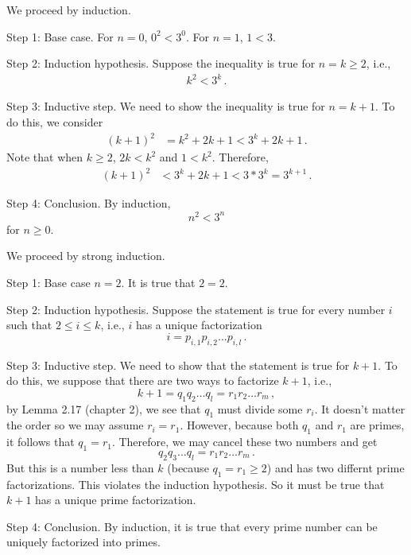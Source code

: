 \documentclass[12pt]{amsart}
\begin{document}
\begin{problem}[4.7]
We proceed by induction.

Step 1: Base case.  For $n= 0$,
$0^2 < 3^0$.
For $n = 1$, $1 < 3$.

Step 2: Induction hypothesis. Suppose the inequality is true for $n = k\geq 2$, i.e.,
\begin{align*}
	k^2 < 3^k \,.
\end{align*}

Step 3: Inductive step. We need to show the inequality is true for $n= k+1$.
To do this, we consider
\begin{align*}
	(k+1)^2 & = k^2 + 2k +1 < 3^k + 2k +1\,.
\end{align*}
Note that when $k\geq 2$, $2k < k^2$ and $1 < k^2$.
Therefore,
\begin{align*}
	(k+1)^2 & < 3^k + 2k +1 < 3*3^k = 3^{k+1}\,.
\end{align*}

Step 4: Conclusion. By induction,
\begin{equation*}
	n^2 < 3^n
\end{equation*}
for $n \geq 0$.
\end{problem}


\begin{problem}[4.21b]
We proceed by strong induction.

Step 1: Base case $n = 2$.
It is true that $2 = 2$.

Step 2: Induction hypothesis.
Suppose the statement is true for every number $i$ such that $2 \leq i \leq k$, i.e.,
$i$ has a unique factorization
\begin{equation*}
	i = p_{i,1} p_{i,2}... p_{i,l} \,.
\end{equation*}



Step 3: Inductive step.
We need to show that the statement is true for $k + 1$.
To do this,
we suppose that there are two ways to factorize $k+1$, i.e.,
\begin{equation*}
	k+1 = q_1q_2\dots q_l = r_1 r_2 \dots r_m \,,
\end{equation*}
by Lemma 2.17 (chapter 2), we see that
$q_1$ must divide some $r_i$. It doesn't matter the order so we may assume $r_i = r_1$.
However, because both $q_1$ and $r_1$ are primes, it follows that $q_1 = r_1$.
Therefore, we may cancel these two numbers and get
\begin{equation*}
	q_2 q_3 \dots q_l = r_1 r_2 \dots r_m \,.
\end{equation*}
But this is a number less than $k$ (because $q_1 = r_1 \geq 2$)
and has two differnt prime factorizations. This violates the
induction hypothesis.
So it must be true that $k+1$ has a unique prime factorization.

Step 4: Conclusion. By induction, it is true that every prime number
can be uniquely factorized into primes.
\end{problem}
\end{document}
